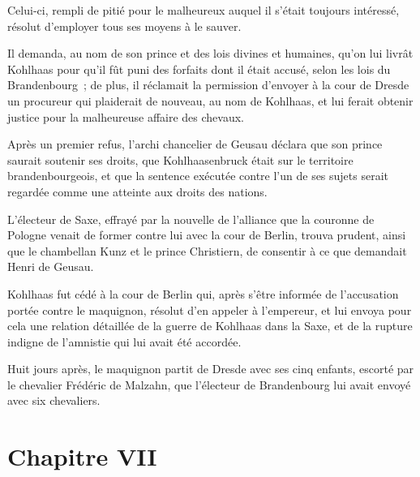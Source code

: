 \documentclass[french,twoside]{book} %
\newcommand\chapteropen{} %
\newcommand\chapterclose{} %
\begin{document}
Celui-ci, rempli de pitié pour le malheureux auquel il s’était toujours intéressé, résolut d’employer tous ses moyens à le sauver.\par
Il demanda, au nom de son prince et des lois divines et humaines, qu’on lui livrât Kohlhaas pour qu’il fût puni des forfaits dont il était accusé, selon les lois du Brandenbourg ; de plus, il réclamait la permission d’envoyer à la cour de Dresde un procureur qui plaiderait de nouveau, au nom de Kohlhaas, et lui ferait obtenir justice pour la malheureuse affaire des chevaux.\par
Après un premier refus, l’archi chancelier de Geusau déclara que son prince saurait soutenir ses droits, que Kohlhaasenbruck était sur le territoire brandenbourgeois, et que la sentence exécutée contre l’un de ses sujets serait regardée comme une atteinte aux droits des nations.\par
L’électeur de Saxe, effrayé par la nouvelle de l’alliance que la couronne de Pologne venait de former contre lui avec la cour de Berlin, trouva prudent, ainsi que le chambellan Kunz et le prince Christiern, de consentir à ce que demandait Henri de Geusau.\par
Kohlhaas fut cédé à la cour de Berlin qui, après s’être informée de l’accusation portée contre le maquignon, résolut d’en appeler à l’empereur, et lui envoya pour cela une relation détaillée de la guerre de Kohlhaas dans la Saxe, et de la rupture indigne de l’amnistie qui lui avait été accordée.\par
Huit jours après, le maquignon partit de Dresde avec ses cinq enfants, escorté par le chevalier Frédéric de Malzahn, que l’électeur de Brandenbourg lui avait envoyé avec six chevaliers.
\chapterclose


\chapteropen
\chapter[{Chapitre VII}]{Chapitre VII}\renewcommand{\leftmark}{Chapitre VII}
\end{document}
